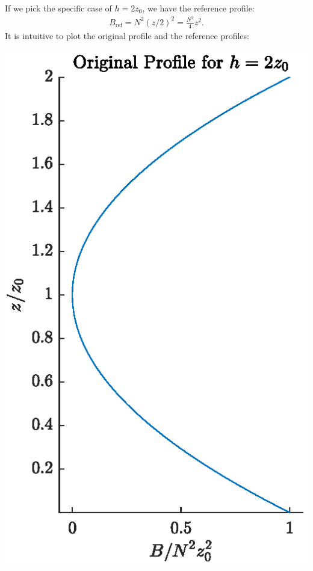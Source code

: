\documentclass[11pt,letterpaper]{book}
\theoremstyle{definition}
\begin{document}
If we pick the specific case of $h = 2z_0$, we have the reference profile:
\begin{align*}
B_\text{ref} = N^2 (z/2)^2 = \frac{N^2}{4}z^2.
\end{align*}
It is intuitive to plot the original profile and the reference profiles:
\begin{center}
\includegraphics[scale=1]{Fig/heq2z0_org}\;\;

\end{center}
\end{document}
